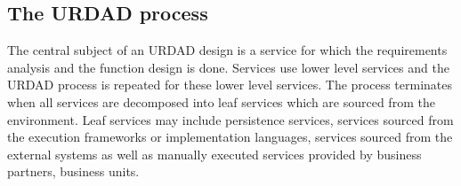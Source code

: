 \subsection{The URDAD process}
\label{sec:urdadProcess}

The central subject of an URDAD design is a service for which the requirements analysis and the function design is done. Services use lower level services and the URDAD process is repeated for these lower level services. The process terminates when all services are decomposed into leaf services which are sourced from the environment. Leaf services may include persistence services, services sourced from the execution frameworks or implementation languages, services sourced from the external systems as well as manually executed services provided by business partners, business units.

